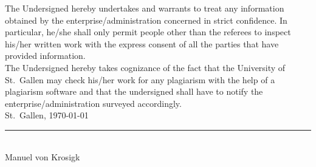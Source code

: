 
The Undersigned hereby undertakes and warrants to treat any information obtained by the enterprise/administration concerned in strict confidence. In particular, he/she shall only permit people other than the referees to inspect his/her written work with the express consent of all the parties that have provided information.\\

\noindent The Undersigned hereby takes cognizance of the fact that the University of St.~Gallen may check his/her work for any plagiarism with the help of a plagiarism software and that the undersigned shall have to notify the enterprise/administration surveyed accordingly.\\

\noindent St.~Gallen, \today\\[.5cm]
\newline \rule{4cm}{.5pt}\\
Manuel von Krosigk
